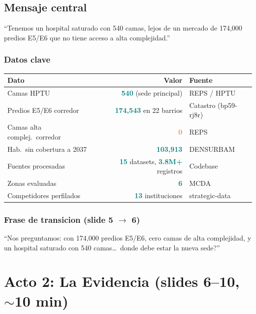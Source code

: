 \documentclass[11pt, a4paper]{article}
\newcommand{\hl}[1]{\textcolor{teal}{\textbf{#1}}}
\newcommand{\dg}[1]{\textcolor{coral}{\textbf{#1}}}
\begin{document}
\subsection{Mensaje central}

\begin{cita}
``Tenemos un hospital saturado con 540 camas, lejos de un mercado de 174,000 predios E5/E6 que no tiene acceso a alta complejidad.''
\end{cita}

\subsubsection{Datos clave}

\begin{tabular}{@{}l r l@{}}
\toprule
\textbf{Dato} & \textbf{Valor} & \textbf{Fuente} \\
\midrule
Camas HPTU & \hl{540} (sede principal) & REPS / HPTU \\
Predios E5/E6 corredor & \hl{174,543} en 22 barrios & Catastro (bp59-rj8r) \\
Camas alta complej.\ corredor & \dg{0} & REPS \\
Hab.\ sin cobertura a 2037 & \hl{103,913} & DENSURBAM \\
Fuentes procesadas & \hl{15} datasets, \hl{3.8M+} registros & Codebase \\
Zonas evaluadas & \hl{6} & MCDA \\
Competidores perfilados & \hl{13} instituciones & strategic-data \\
\bottomrule
\end{tabular}

\subsubsection{Frase de transicion (slide 5 $\to$ 6)}

\begin{cita}
``Nos preguntamos: con 174,000 predios E5/E6, cero camas de alta complejidad, y un hospital saturado con 540 camas\ldots\ donde debe estar la nueva sede?''
\end{cita}

\section{Acto 2: La Evidencia (slides 6--10, $\sim$10 min)}
\end{document}
